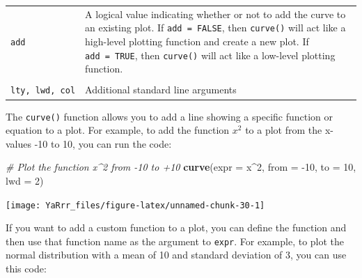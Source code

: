 \documentclass[]{book}
\newenvironment{Shaded}{\begin{snugshade}}{\end{snugshade}}
\newcommand{\KeywordTok}[1]{\textcolor[rgb]{0.13,0.29,0.53}{\textbf{{#1}}}}
\newcommand{\DataTypeTok}[1]{\textcolor[rgb]{0.13,0.29,0.53}{{#1}}}
\newcommand{\DecValTok}[1]{\textcolor[rgb]{0.00,0.00,0.81}{{#1}}}
\newcommand{\CommentTok}[1]{\textcolor[rgb]{0.56,0.35,0.01}{\textit{{#1}}}}
\newcommand{\NormalTok}[1]{{#1}}
\theoremstyle{definition}
\theoremstyle{definition}
\theoremstyle{remark}
\begin{document}
\begin{longtable}[]{@{}ll@{}}
\begin{minipage}[t]{0.14\columnwidth}
\texttt{add}\strut
\end{minipage} & \begin{minipage}[t]{0.71\columnwidth}\raggedright\strut
A logical value indicating whether or not to add the curve to an
existing plot. If \texttt{add\ =\ FALSE}, then \texttt{curve()} will act
like a high-level plotting function and create a new plot. If
\texttt{add\ =\ TRUE}, then \texttt{curve()} will act like a low-level
plotting function.\strut
\end{minipage}\tabularnewline
\begin{minipage}[t]{0.14\columnwidth}\raggedright\strut
\strut
\end{minipage}\tabularnewline
\begin{minipage}[t]{0.14\columnwidth}\raggedright\strut
\texttt{lty,\ lwd,\ col}\strut
\end{minipage} & \begin{minipage}[t]{0.71\columnwidth}\raggedright\strut
Additional standard line arguments\strut
\end{minipage}\tabularnewline
\bottomrule
\end{longtable}

The \texttt{curve()} function allows you to add a line showing a
specific function or equation to a plot. For example, to add the
function \(x^2\) to a plot from the x-values -10 to 10, you can run the
code:

\begin{Shaded}
\begin{Highlighting}[]
\CommentTok{# Plot the function x^2 from -10 to +10}
\KeywordTok{curve}\NormalTok{(}\DataTypeTok{expr =} \NormalTok{x^}\DecValTok{2}\NormalTok{, }
      \DataTypeTok{from =} \NormalTok{-}\DecValTok{10}\NormalTok{, }
      \DataTypeTok{to =} \DecValTok{10}\NormalTok{, }\DataTypeTok{lwd =} \DecValTok{2}\NormalTok{)}
\end{Highlighting}
\end{Shaded}

\begin{center}\texttt{[image: YaRrr\_files/figure-latex/unnamed-chunk-30-1]} \end{center}

If you want to add a custom function to a plot, you can define the
function and then use that function name as the argument to
\texttt{expr}. For example, to plot the normal distribution with a mean
of 10 and standard deviation of 3, you can use this code:
\end{document}
